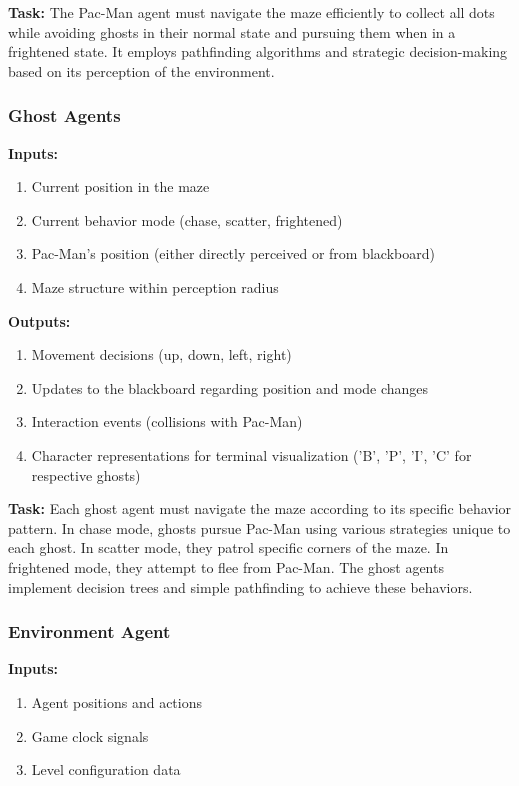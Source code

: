 \documentclass[a4paper, 11pt]{article}
\begin{document}
\textbf{Task:} The Pac-Man agent must navigate the maze efficiently to collect all dots while avoiding ghosts in their normal state and pursuing them when in a frightened state. It employs pathfinding algorithms and strategic decision-making based on its perception of the environment.

\subsubsection{Ghost Agents}
\textbf{Inputs:}
\begin{enumerate}
    \item Current position in the maze
    \item Current behavior mode (chase, scatter, frightened)
    \item Pac-Man's position (either directly perceived or from blackboard)
    \item Maze structure within perception radius
\end{enumerate}

\textbf{Outputs:}
\begin{enumerate}
    \item Movement decisions (up, down, left, right)
    \item Updates to the blackboard regarding position and mode changes
    \item Interaction events (collisions with Pac-Man)
    \item Character representations for terminal visualization ('B', 'P', 'I', 'C' for respective ghosts)
\end{enumerate}

\textbf{Task:} Each ghost agent must navigate the maze according to its specific behavior pattern. In chase mode, ghosts pursue Pac-Man using various strategies unique to each ghost. In scatter mode, they patrol specific corners of the maze. In frightened mode, they attempt to flee from Pac-Man. The ghost agents implement decision trees and simple pathfinding to achieve these behaviors.

\subsubsection{Environment Agent}
\textbf{Inputs:}
\begin{enumerate}
    \item Agent positions and actions
    \item Game clock signals
    \item Level configuration data
\end{enumerate}
\end{document}
